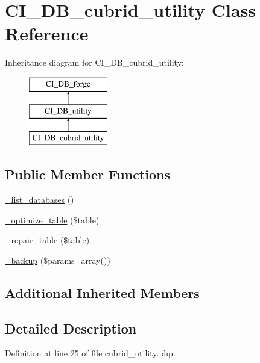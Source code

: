 \hypertarget{class_c_i___d_b__cubrid__utility}{\section{C\-I\-\_\-\-D\-B\-\_\-cubrid\-\_\-utility Class Reference}
\label{class_c_i___d_b__cubrid__utility}
}
Inheritance diagram for C\-I\-\_\-\-D\-B\-\_\-cubrid\-\_\-utility\-:\begin{figure}[H]
\begin{center}
\leavevmode
\includegraphics[height=3.000000cm]{class_c_i___d_b__cubrid__utility}
\end{center}
\end{figure}
\subsection*{Public Member Functions}
\begin{DoxyCompactItemize}
\item 
\hyperlink{class_c_i___d_b__cubrid__utility_aa047e69a7e732ca7280270f87f82bb3a}{\-\_\-list\-\_\-databases} ()
\item 
\hyperlink{class_c_i___d_b__cubrid__utility_a4856292816fbbc8e9d927f565766727b}{\-\_\-optimize\-\_\-table} (\$table)
\item 
\hyperlink{class_c_i___d_b__cubrid__utility_a7f40d4a3d78917e455e315cf708842ef}{\-\_\-repair\-\_\-table} (\$table)
\item 
\hyperlink{class_c_i___d_b__cubrid__utility_a30f3053d2c82e7562349924363507afa}{\-\_\-backup} (\$params=array())
\end{DoxyCompactItemize}
\subsection*{Additional Inherited Members}


\subsection{Detailed Description}


Definition at line 25 of file cubrid\-\_\-utility.\-php.



